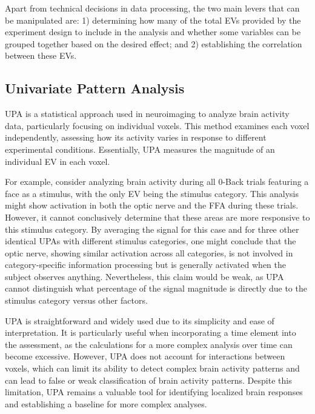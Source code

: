 
Apart from technical decisions in data processing, the two main levers that can be manipulated are: 1) determining how many of the total \gls{EVs} provided by the experiment design to include in the analysis and whether some variables can be grouped together based on the desired effect; and 2) establishing the correlation between these \gls{EVs}.

\subsection{Univariate Pattern Analysis}

\gls{UPA} is a statistical approach used in neuroimaging to analyze brain activity data, particularly focusing on individual voxels. This method examines each voxel independently, assessing how its activity varies in response to different experimental conditions. Essentially, \gls{UPA} measures the magnitude of an individual \gls{EV} in each voxel.

For example, consider analyzing brain activity during all 0-Back trials featuring a face as a stimulus, with the only \gls{EV} being the stimulus category. This analysis might show activation in both the optic nerve and the \gls{FFA} during these trials. However, it cannot conclusively determine that these areas are more responsive to this stimulus category. By averaging the signal for this case and for three other identical \gls{UPA}s with different stimulus categories, one might conclude that the optic nerve, showing similar activation across all categories, is not involved in category-specific information processing but is generally activated when the subject observes anything. Nevertheless, this claim would be weak, as \gls{UPA} cannot distinguish what percentage of the signal magnitude is directly due to the stimulus category versus other factors.

\gls{UPA} is straightforward and widely used due to its simplicity and ease of interpretation. It is particularly useful when incorporating a time element into the assessment, as the calculations for a more complex analysis over time can become excessive. However, \gls{UPA} does not account for interactions between voxels, which can limit its ability to detect complex brain activity patterns and can lead to false or weak classification of brain activity patterns. Despite this limitation, \gls{UPA} remains a valuable tool for identifying localized brain responses and establishing a baseline for more complex analyses.

